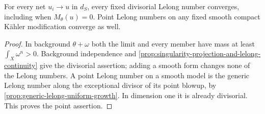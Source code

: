 \begin{corollary}\label{cor:singularity-lelong-continuity-all-masses}
For every net $u_i\to u$ in $d_S$, every fixed divisorial Lelong number converges, including when $M_\theta(u)=0$. Point Lelong numbers on any fixed smooth compact K\"ahler modification converge as well.
\end{corollary}
\begin{proof}
In background $\theta+\omega$ both the limit and every member have mass at least $\int_X\omega^n>0$. Background independence and \cref{prop:singularity-projection-and-lelong-continuity} give the divisorial assertion; adding a smooth form changes none of the Lelong numbers. A point Lelong number on a smooth model is the generic Lelong number along the exceptional divisor of its point blowup, by \cref{prop:generic-lelong-uniform-growth}. In dimension one it is already divisorial. This proves the point assertion.
\end{proof}

